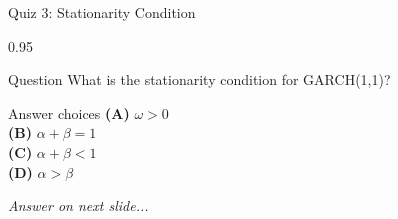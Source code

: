 \documentclass[9pt, aspectratio=169, t]{beamer}
\begin{document}
\begin{frame}{Quiz 3: Stationarity Condition}
    \begin{cminipage}{0.95\textwidth}
    \begin{alertblock}{Question}
        What is the stationarity condition for GARCH(1,1)?
    \end{alertblock}

    \vspace{0.4cm}

    \begin{block}{Answer choices}
        \textcolor{MainBlue}{\textbf{(A)}} $\omega > 0$\\[3pt]
        \textcolor{MainBlue}{\textbf{(B)}} $\alpha + \beta = 1$\\[3pt]
        \textcolor{MainBlue}{\textbf{(C)}} $\alpha + \beta < 1$\\[3pt]
        \textcolor{MainBlue}{\textbf{(D)}} $\alpha > \beta$
    \end{block}

    \vspace{0.5cm}

    \begin{center}
        \textit{Answer on next slide...}
    \end{center}
    \end{cminipage}
\end{frame}
\end{document}
